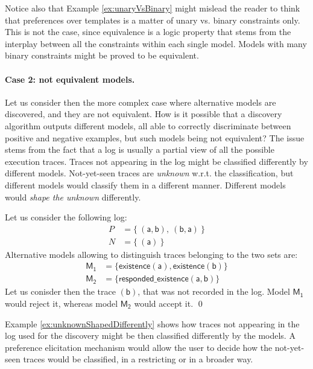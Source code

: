Notice also that Example \ref{ex:unaryVsBinary} might mislead the reader to think that preferences over templates is a matter of unary vs. binary constraints only. This is not the case, since equivalence is a logic property that stems from the interplay between all the constraints within each single model. Models with many binary constraints might be proved to be equivalent.


\paragraph{Case 2: not equivalent models.}
Let us consider then the more complex case where alternative models are discovered, and they are not equivalent. How is it possible that a discovery algorithm outputs different models, all able to correctly discriminate between positive and negative examples, but such models being not equivalent? The issue stems from the fact that a log is usually a partial view of all the possible execution traces. Traces not appearing in the log might be classified differently by different models. Not-yet-seen traces are \emph{unknown} w.r.t. the classification, but different models would classify them in a different manner. Different models would \emph{shape the unknown} differently.

\begin{example}
\label{ex:unknownShapedDifferently}
Let us consider the following log:
\begin{align*}
P & = \{\ (\mathsf{a}, \mathsf{b}),\ (\mathsf{b}, \mathsf{a})\ \} \\
N & = \{\ (\mathsf{a})\ \}
\end{align*}
%
Alternative models allowing to distinguish traces belonging to the two sets are:
\begin{align*}
\mathsf{M_1} & = \{ \mathsf{existence(a),existence(b)}\} \\
\mathsf{M_2} & = \{ \mathsf{responded\_existence(a, b)}\}
\end{align*}
%
Let us conisder then the trace $\mathsf{(b)}$, that was not recorded in the log. Model $\mathsf{M_1}$ would reject it, whereas model $\mathsf{M_2}$ would accept it.
\qed
\end{example}

Example \ref{ex:unknownShapedDifferently} shows how traces not appearing in the log used for the discovery might be then classified differently by the models. A preference elicitation mechanism would allow the user to decide how the not-yet-seen traces would be classified, in a restricting or in a broader way.



